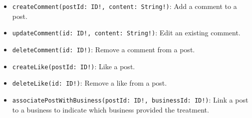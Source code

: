 \begin{itemize}[leftmargin=*]
\begin{itemize}
        \item \texttt{createComment(postId: ID!, content: String!)}: Add a comment to a post.
        \item \texttt{updateComment(id: ID!, content: String!)}: Edit an existing comment.
        \item \texttt{deleteComment(id: ID!)}: Remove a comment from a post.

        \item \texttt{createLike(postId: ID!)}: Like a post.
        \item \texttt{deleteLike(id: ID!)}: Remove a like from a post.

        \item \texttt{associatePostWithBusiness(postId: ID!, businessId: ID!)}: Link a post to a business to indicate which business provided the treatment.
    \end{itemize}
\end{itemize}
